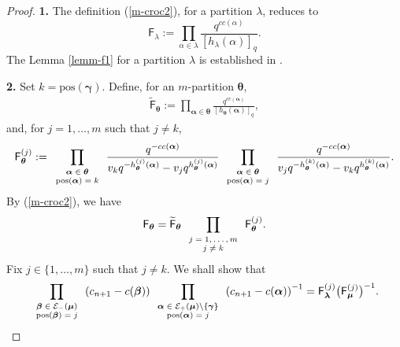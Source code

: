 \documentclass[pdftex]{sigma}
\newcommand{\pos}{{\mathrm{pos}}}
\newcommand{\cc}{cc}
\newcommand{\lam}{\boldsymbol{\lambda}}
\newcommand{\mum}{\boldsymbol{\mu}}
\newcommand{\alm}{\boldsymbol{\alpha}}
\newcommand{\bem}{\boldsymbol{\beta}}
\newcommand{\gam}{\boldsymbol{\gamma}}
\newcommand{\tem}{\boldsymbol{\theta}}
\begin{document}
\begin{proof}
{\bf 1.} The def\/inition (\ref{m-croc2}),  for a partition $\lambda$,  reduces to
\[
\textsf{F}_{\lambda}:=\prod_{\alpha\in \lambda}\frac{q^{\cc(\alpha)}}{\left[h_{\lambda}(\alpha)\right]_q} .
\]
The Lemma \ref{lemm-f1} for a partition $\lambda$ is established in \cite[Lemma 3.2]{IMO}.

{\bf 2.} Set $k=\text{pos}(\gam)$. Def\/ine, for an $m$-partition $\tem$,
\begin{gather*}%
\widetilde{\textsf{F}}
_{\tem}:=\prod_{\alm\in \tem}\frac{q^{\cc(\alm)}}{\left[h_{\tem}(\alm)\right]_q}  ,
\end{gather*}
and, for $j=1,\dots,m$ such that $j\neq k$,
\begin{gather}\label{eq-F11b}
\textsf{F}^{(j)}_{\tem}:= \prod_{\textrm{\scriptsize{$\begin{array}{c}\alm\in\tem\\ \pos(\alm)=k\end{array}$}}} \frac{q^{-\cc(\alm)}}{v_kq^{-h^{(j)}_{\tem}(\alm)} -v_jq^{h^{(j)}_{\tem}(\alm)}} \prod_{\textrm{\scriptsize{$\begin{array}{c}\alm\in\tem\\ \pos(\alm)=j\end{array}$}}} \frac{q^{-\cc(\alm)}}{v_jq^{-h^{(k)}_{\tem}(\alm)} -v_kq^{h^{(k)}_{\tem}(\alm)}}  .
\end{gather}
By (\ref{m-croc2}), we have
\begin{gather}\label{eq-F11c}
\textsf{F}_{\tem}=\widetilde{\textsf{F}}_{\tem}\prod_{\textrm{\scriptsize{$\begin{array}{c}j=1,\dots,m\\j\neq k\end{array}$}}}\textsf{F}^{(j)}_{\tem}  .
\end{gather}
Fix $j\in\{1,\dots,m\}$ such that $j\neq k$. We shall show that
\begin{gather}\label{eq-F11d}
 \prod_{\textrm{\scriptsize{$\begin{array}{c}\bem\in {\cal{E}}_-(\mum)\\ \pos(\bem)=j\end{array}$}}} \left(c_{n+1}-c(\bem)\right) \prod_{\textrm{\scriptsize{$\begin{array}{c}\alm\in {\cal{E}}_+(\mum)\backslash\{\gam\}\\ \pos(\alm)=j\end{array}$}}} \left(c_{n+1}-c(\alm)\right)^{-1}=\textsf{F}^{(j)}_{\lam}\big(\textsf{F}^{(j)}_{\mum}\big)^{-1}  .
\end{gather}


\end{proof}
\end{document}
